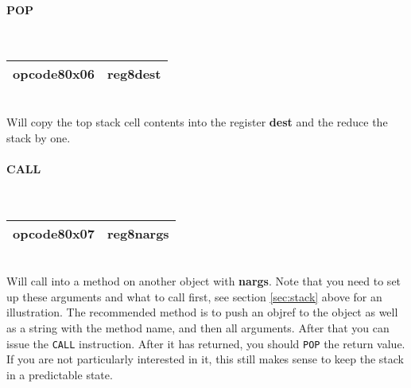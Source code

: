 \documentclass[12pt,a4paper]{article}
\begin{document}
\vspace{2em}\begin{minipage}{\textwidth}
\paragraph{POP}
~\vspace{1em}\\\begin{tabular}{|p{2cm}|p{2cm}|}
\hline
opcode8\newline\textbf{0x06} & reg8\newline\textbf{dest} \\
\hline
\end{tabular}\vspace{1em}\\
Will copy the top stack cell contents into the register \textbf{dest} and the reduce the stack by one.
\end{minipage}

\vspace{2em}\begin{minipage}{\textwidth}
\paragraph{CALL}
~\vspace{1em}\\\begin{tabular}{|p{2cm}|p{2cm}|}
\hline
opcode8\newline\textbf{0x07} & reg8\newline\textbf{nargs} \\
\hline
\end{tabular}\vspace{1em}\\
Will call into a method on another object with \textbf{nargs}. Note that you need to set up these arguments and what to call first, see section \ref{sec:stack} above for an illustration. The recommended method is to push an objref  to the object as well as a string with the method name, and then all arguments. After that you can issue the \verb|CALL| instruction. After it has  returned, you should \verb|POP| the return value. If you are not particularly interested in it, this still makes sense to keep the stack in a predictable state.
\end{minipage}
\end{document}
